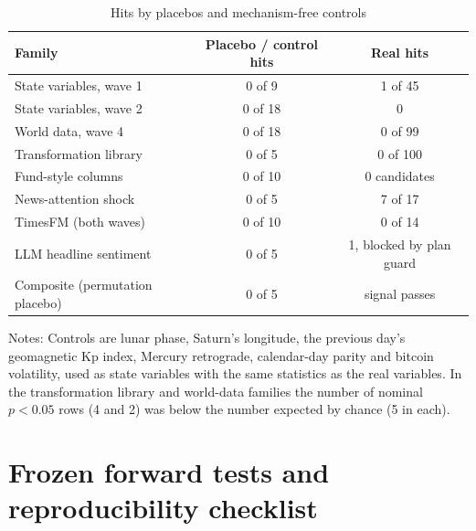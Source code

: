 \begin{table}[htbp]
\centering
\begin{threeparttable}
\caption{Hits by placebos and mechanism-free controls}\label{tab:calibration}
\small
\begin{tabularx}{\textwidth}{@{}Lcc@{}}
\toprule
Family & Placebo / control hits & Real hits \\
\midrule
State variables, wave 1 & 0 of 9 & 1 of 45 \\
State variables, wave 2 & 0 of 18 & 0 \\
World data, wave 4 & 0 of 18 & 0 of 99 \\
Transformation library & 0 of 5 & 0 of 100 \\
Fund-style columns & 0 of 10 & 0 candidates \\
News-attention shock & 0 of 5 & 7 of 17 \\
TimesFM (both waves) & 0 of 10 & 0 of 14 \\
LLM headline sentiment & 0 of 5 & 1, blocked by plan guard \\
Composite (permutation placebo) & 0 of 5 & signal passes \\
\bottomrule
\end{tabularx}
\begin{tablenotes}\footnotesize
\item Notes: Controls are lunar phase, Saturn's longitude, the previous day's geomagnetic Kp index, Mercury retrograde, calendar-day parity and bitcoin volatility, used as state variables with the same statistics as the real variables. In the transformation library and world-data families the number of nominal $p<0.05$ rows (4 and 2) was below the number expected by chance (5 in each).
\end{tablenotes}
\end{threeparttable}
\end{table}

\section{Frozen forward tests and reproducibility checklist}\label{app:checklist}

